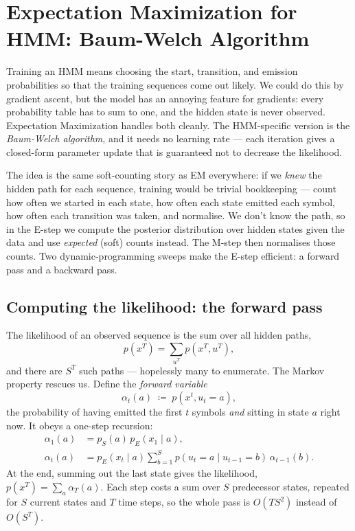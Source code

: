 \documentclass[11pt, oneside]{book}
\newcommand{\eqdef}{\coloneqq}
\begin{document}
\section{Expectation Maximization for HMM: Baum-Welch Algorithm}

Training an HMM means choosing the start, transition, and emission probabilities
so that the training sequences come out likely. We could do this by gradient
ascent, but the model has an annoying feature for gradients: every probability
table has to sum to one, and the hidden state is never observed. Expectation
Maximization handles both cleanly. The HMM-specific version is the
\emph{Baum-Welch algorithm}, and it needs no learning rate — each iteration
gives a closed-form parameter update that is guaranteed not to decrease the
likelihood.

The idea is the same soft-counting story as EM everywhere: if we \emph{knew} the
hidden path for each sequence, training would be trivial bookkeeping — count how
often we started in each state, how often each state emitted each symbol, how
often each transition was taken, and normalise. We don't know the path, so in
the E-step we compute the posterior distribution over hidden states given the
data and use \emph{expected} (soft) counts instead. The M-step then normalises
those counts. Two dynamic-programming sweeps make the E-step efficient: a
forward pass and a backward pass.

\subsection*{Computing the likelihood: the forward pass}

The likelihood of an observed sequence is the sum over all hidden paths,
\[
  p(x^T) = \sum_{u^T} p(x^T, u^T),
\]
and there are $S^T$ such paths — hopelessly many to enumerate. The Markov
property rescues us. Define the \emph{forward variable}
\[
  \alpha_t(a) \;\eqdef\; p(x^t, u_t = a),
\]
the probability of having emitted the first $t$ symbols \emph{and} sitting in
state $a$ right now. It obeys a one-step recursion:
\begin{align*}
  \alpha_1(a) &= p_S(a)\, p_E(x_1 \mid a), \\
  \alpha_t(a) &= p_E(x_t \mid a) \sum_{b=1}^{S} p(u_t = a \mid u_{t-1} = b)\,
                 \alpha_{t-1}(b).
\end{align*}
At the end, summing out the last state gives the likelihood,
$p(x^T) = \sum_{a} \alpha_T(a)$. Each step costs a sum over $S$ predecessor
states, repeated for $S$ current states and $T$ time steps, so the whole pass is
$O(T S^2)$ instead of $O(S^T)$.
\end{document}
